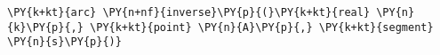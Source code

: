 \begin{Verbatim}[commandchars=\\\{\}]
    \PY{k+kt}{arc} \PY{n+nf}{inverse}\PY{p}{(}\PY{k+kt}{real} \PY{n}{k}\PY{p}{,} \PY{k+kt}{point} \PY{n}{A}\PY{p}{,} \PY{k+kt}{segment} \PY{n}{s}\PY{p}{)}
\end{Verbatim}
